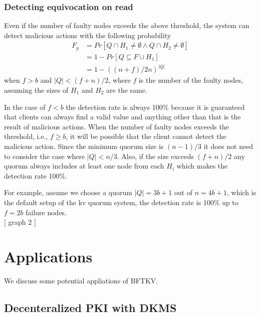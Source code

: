 \documentclass[twoside,twocolumn,10pt,fleqn]{article}
\begin{document}
\subsubsection*{Detecting equivocation on read}
Even if the number of faulty nodes exceeds the above threshold, the
system can detect malicious actions with the following probability
\begin{align*}
  F_p &= Pr[Q \cap H_1 \neq \emptyset \wedge Q \cap H_2 \neq
        \emptyset] \\
      & = 1 - Pr[Q \subseteq F \cup H_1] \\
      & = 1 - ((n + f) / 2n)^{|Q|}
\end{align*}
when $f > b$ and $|Q| < (f + n)/2$, where $f$ is the number of the
faulty nodes, assuming the sizes of $H_1$ and $H_2$ are the same.

In the case of $f < b$ the detection rate is always 100\% because it is
guaranteed that clients can always find a valid value and anything
other than that is the result of malicious actions. When the number of
faulty nodes exceeds the threshold, i.e., $f \geq b$, it will be possible that
the client cannot detect the malicious action. Since the minimum
quorum size is $(n-1)/3$ it does not need to consider the case where
$|Q| < n/3$. Also, if the size exceeds $(f+n)/2$ any quorum always
includes at least one node from each $H_i$ which makes the detection
rate 100\%. \\


For example, assume we choose a quorum $|Q| = 3b+1$ out of $n = 4b+1$,
which is the default setup of the kv quorum system, the detection rate
is 100\% up to $f = 2b$ failure nodes. \\

[ graph 2 ] \\

\section{Applications}

We discuss some potential appliations of BFTKV.

\subsection{Decenteralized PKI with DKMS}
\end{document}
